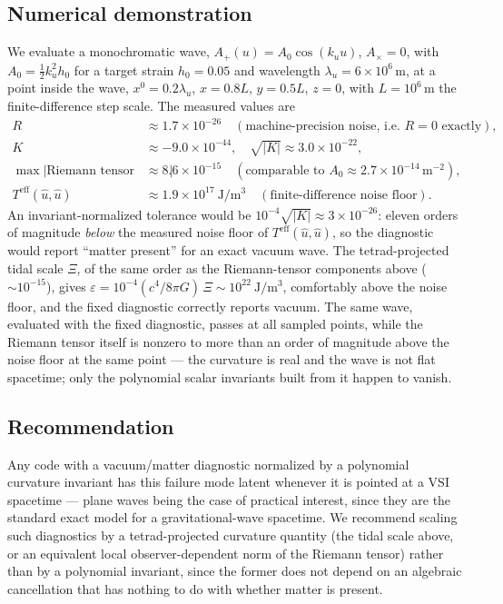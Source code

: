 \documentclass[aps,onecolumn,10pt,nofootinbib]{revtex4-2}
\begin{document}
\subsection{Numerical demonstration}
\label{sec:vsi-demo}

We evaluate a monochromatic wave, $A_+(u) = A_0 \cos(k_u u)$, $A_\times =
0$, with $A_0 = \tfrac{1}{2}k_u^2 h_0$ for a target strain $h_0 = 0.05$ and
wavelength $\lambda_u = 6\times 10^6\,\mathrm{m}$, at a point inside the
wave, $x^0 = 0.2\lambda_u$, $x = 0.8L$, $y = 0.5L$, $z=0$, with
$L = 10^6\,\mathrm{m}$ the finite-difference step scale. The measured
values are
\begin{align}
  R &\approx 1.7\times 10^{-26} \quad (\text{machine-precision noise, i.e. } R = 0 \text{ exactly}), \\
  K &\approx -9.0\times 10^{-44}, \quad \sqrt{|K|} \approx 3.0\times 10^{-22}, \\
  \max|\text{Riemann tensor component}| &\approx 8.6\times 10^{-15} \quad (\text{comparable to } A_0 \approx 2.7\times 10^{-14}\,\mathrm{m^{-2}}), \\
  T^{\text{eff}}(\hat u, \hat u) &\approx 1.9\times 10^{17}\ \mathrm{J/m^3} \quad (\text{finite-difference noise floor}).
\end{align}
An invariant-normalized tolerance would be
$10^{-4}\sqrt{|K|} \approx 3\times 10^{-26}$: eleven orders of magnitude
\emph{below} the measured noise floor of
$T^{\text{eff}}(\hat u,\hat u)$, so the diagnostic would report
``matter present'' for an exact vacuum wave. The tetrad-projected tidal
scale $\Xi$, of the same order as the Riemann-tensor components above
($\sim 10^{-15}$), gives
$\varepsilon = 10^{-4}(c^4/8\pi G)\,\Xi \sim 10^{22}\ \mathrm{J/m^3}$,
comfortably above the noise floor, and the fixed diagnostic correctly
reports vacuum. The same wave, evaluated with the fixed diagnostic,
passes at all sampled points, while the Riemann tensor itself is
nonzero to more than an order of magnitude above the noise floor at the
same point — the curvature is real and the wave is not flat spacetime;
only the polynomial scalar invariants built from it happen to vanish.

\subsection{Recommendation}

Any code with a vacuum/matter diagnostic normalized by a polynomial
curvature invariant has this failure mode latent whenever it is pointed
at a VSI spacetime — plane waves being the case of practical interest,
since they are the standard exact model for a gravitational-wave
spacetime. We recommend scaling such diagnostics by a tetrad-projected
curvature quantity (the tidal scale above, or an equivalent local
observer-dependent norm of the Riemann tensor) rather than by a
polynomial invariant, since the former does not depend on an algebraic
cancellation that has nothing to do with whether matter is present.
\end{document}
